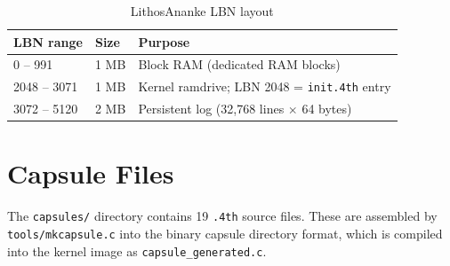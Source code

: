 \begin{table}[ht]
  \centering
  \caption{LithosAnanke LBN layout}
  \label{tab:lbn-layout}
  \begin{tabular}{lll}
    \toprule
    LBN range & Size & Purpose \\
    \midrule
    0 -- 991      & 1 MB & Block RAM (dedicated RAM blocks) \\
    2048 -- 3071  & 1 MB & Kernel ramdrive; LBN 2048 = \texttt{init.4th} entry \\
    3072 -- 5120  & 2 MB & Persistent log (32,768 lines $\times$ 64 bytes) \\
    \bottomrule
  \end{tabular}
\end{table}

\section{Capsule Files}
\label{vol2:sec:capsules:files}


The \texttt{capsules/} directory contains 19 \texttt{.4th} source files.
These are assembled by \texttt{tools/mkcapsule.c} into the binary capsule
directory format, which is compiled into the kernel image as
\texttt{capsule\_generated.c}.

